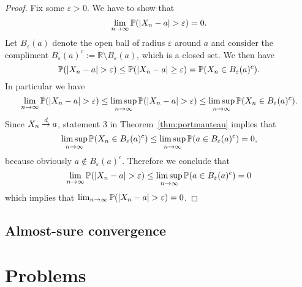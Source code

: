\begin{proof}
Fix some $\varepsilon > 0$. We have to show that
\[
	\lim_{n \to \infty} \bbP(|X_n-a|>\varepsilon) = 0.
\]
Let $B_\varepsilon(a)$ denote the open ball of radius $\varepsilon$ around $a$ and consider the compliment $B_\varepsilon(a)^c := \mathbb{R} \setminus B_\varepsilon(a)$, which is a closed set. We then have
\[
	\bbP(|X_n-a|>\varepsilon) \le \bbP(|X_n-a|\ge\varepsilon) = \bbP(X_n \in B_\varepsilon(a)^c). 
\]
In particular we have
\[
	\lim_{n \to \infty} \bbP(|X_n-a|>\varepsilon) \le \limsup_{n \to \infty} \bbP(|X_n-a|>\varepsilon)
	\le \limsup_{n \to \infty} \bbP(X_n \in B_\varepsilon(a)^c).
\]
Since $X_n \stackrel{d}{\rightarrow} a$, statement 3 in Theorem~\ref{thm:portmanteau} implies that 
\[
	\limsup_{n \to \infty} \mathbb P(X_n \in B_\varepsilon(a)^c)
	\le \limsup_{n \to \infty} \mathbb P(a \in B_\varepsilon(a)^c) = 0,
\]
because obviously $a \notin B_\varepsilon(a)^c$. Therefore we conclude that
\[
	\lim_{n \to \infty} \bbP(|X_n-a|>\varepsilon)
	\le \limsup_{n \to \infty} \bbP(a \in B_\varepsilon(a)^c) = 0
\]
which implies that $\lim_{n \to \infty} \bbP(|X_n-a|>\varepsilon) = 0$.
\end{proof}


\subsection{Almost-sure convergence}

\section{Problems}

